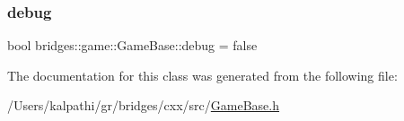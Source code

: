 \subsubsection{\texorpdfstring{debug}{debug}}
{\footnotesize\ttfamily bool bridges\+::game\+::\+Game\+Base\+::debug = false\hspace{0.3cm}{\ttfamily [protected]}}



The documentation for this class was generated from the following file\+:\begin{DoxyCompactItemize}
\item 
/\+Users/kalpathi/gr/bridges/cxx/src/\mbox{\hyperlink{_game_base_8h}{Game\+Base.\+h}}\end{DoxyCompactItemize}
